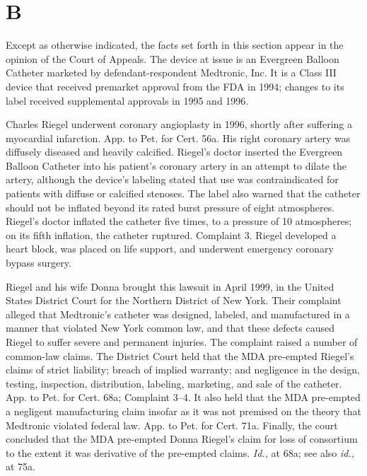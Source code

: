 {\section{B}

  Except as otherwise indicated, the facts set forth in this section
appear in the opinion of the Court of Appeals. The device at issue is an
Evergreen Balloon Catheter marketed by defendant-respondent Medtronic,
Inc. It is a Class III device that received premarket approval from the
FDA in 1994; changes to its label received supplemental approvals in
1995 and 1996.

  Charles Riegel underwent coronary angioplasty in 1996, shortly after
suffering a myocardial infarction. App. to Pet. for Cert. 56a. His
right coronary artery was diffusely diseased and heavily calcified.
Riegel's doctor inserted the Evergreen Balloon Catheter into his
patient's coronary artery in an attempt to dilate the artery, although
the device's labeling stated that use was contraindicated for patients
with diffuse or calcified stenoses. The label also warned that the
catheter should not be inflated beyond its rated burst pressure of
eight atmospheres. Riegel's doctor inflated the catheter five times,
to a pressure of 10 atmospheres; on its fifth inflation, the catheter
ruptured. Complaint 3. Riegel developed a heart block, was placed on
life support, and underwent emergency coronary bypass surgery.

  Riegel and his wife Donna brought this lawsuit in April 1999, in the
United States District Court for the Northern District of New York.
Their complaint alleged that Medtronic's catheter was designed,
labeled, and manufactured in a manner that violated New York common law,
and that these defects caused Riegel to suffer severe and permanent
injuries. The complaint raised a number of common-law claims. The
District Court held that the MDA pre-empted Riegel's claims of strict
liability; breach of implied warranty; and negligence in the design,
testing, inspection, distribution, labeling, marketing, and sale of the
catheter. App. to \newpage  Pet. for Cert. 68a; Complaint 3--4. It also
held that the MDA pre-empted a negligent manufacturing claim insofar as
it was not premised on the theory that Medtronic violated federal law.
App. to Pet. for Cert. 71a. Finally, the court concluded that the MDA
pre-empted Donna Riegel's claim for loss of consortium to the extent
it was derivative of the pre-empted claims. \emph{Id.,} at 68a; see also
\emph{id.,} at 75a.\footnotemark[2]

}

